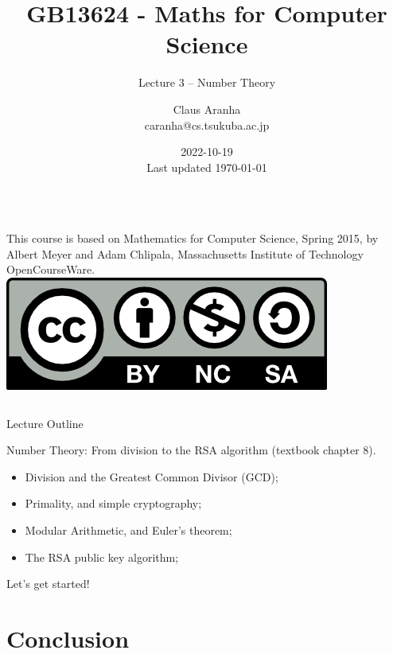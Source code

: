 \documentclass[aspectratio=169]{beamer}
\title[GB13624]{GB13624 - Maths for Computer Science}
\subtitle[]{Lecture 3 -- Number Theory}
\author[Claus Aranha]{Claus Aranha\\{\footnotesize caranha@cs.tsukuba.ac.jp}}
\institute[COINS]{College of Information Science}
\date[2022-10-19]{2022-10-19\\{\tiny Last updated \today}}
\begin{document}
\begin{frame}
  \maketitle

  \begin{columns}
    {\smaller This course is based on Mathematics for Computer Science, Spring
    2015, by Albert Meyer and Adam Chlipala, Massachusetts Institute
    of Technology OpenCourseWare.}
    \includegraphics[width=\textwidth]{../img/by-nc-sa}
  \end{columns}
\end{frame}

\begin{frame}{Lecture Outline}

  Number Theory: From division to the RSA algorithm (textbook chapter 8).\bigskip

  \begin{itemize}
    \item Division and the Greatest Common Divisor (GCD);
    \item Primality, and simple cryptography;
    \item Modular Arithmetic, and Euler's theorem;
    \item The RSA public key algorithm;
  \end{itemize}\bigskip

  Let's get started!
\end{frame}









\section{Conclusion}


\end{document}

